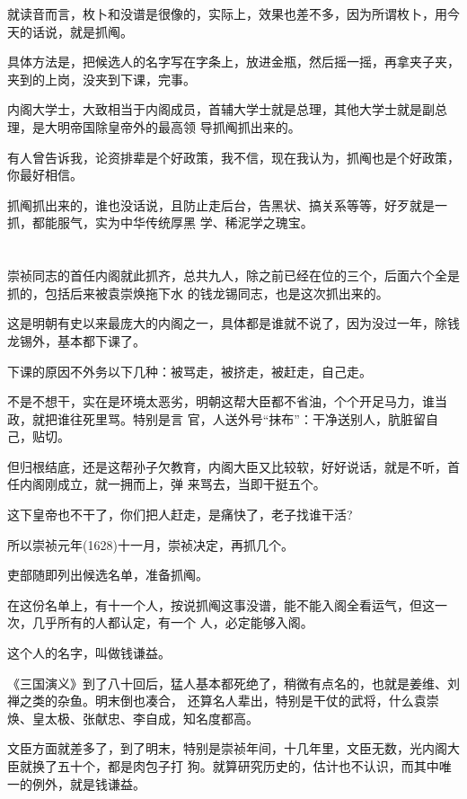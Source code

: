 \documentclass[11pt,a4paper,onecolumn]{article}
\begin{document}
就读音而言，枚卜和没谱是很像的，实际上，效果也差不多，因为所谓枚卜，用今天的话说，就是抓阄。

具体方法是，把候选人的名字写在字条上，放进金瓶，然后摇一摇，再拿夹子夹，夹到的上岗，没夹到下课，完事。

内阁大学士，大致相当于内阁成员，首辅大学士就是总理，其他大学士就是副总理，是大明帝国除皇帝外的最高领
导\myrule 抓阄抓出来的。

有人曾告诉我，论资排辈是个好政策，我不信，现在我认为，抓阄也是个好政策，你最好相信。

抓阄抓出来的，谁也没话说，且防止走后台，告黑状、搞关系等等，好歹就是一抓，都能服气，实为中华传统厚黑
学、稀泥学之瑰宝。

\section[\thesection]{}

崇祯同志的首任内阁就此抓齐，总共九人，除之前已经在位的三个，后面六个全是抓的，包括后来被袁崇焕拖下水
的钱龙锡同志，也是这次抓出来的。

这是明朝有史以来最庞大的内阁之一，具体都是谁就不说了，因为没过一年，除钱龙锡外，基本都下课了。

下课的原因不外务以下几种：被骂走，被挤走，被赶走，自己走。

不是不想干，实在是环境太恶劣，明朝这帮大臣都不省油，个个开足马力，谁当政，就把谁往死里骂。特别是言
官，人送外号``抹布''：干净送别人，肮脏留自己，贴切。

但归根结底，还是这帮孙子欠教育，内阁大臣又比较软，好好说话，就是不听，首任内阁刚成立，就一拥而上，弹
来骂去，当即干挺五个。

这下皇帝也不干了，你们把人赶走，是痛快了，老子找谁干活?

所以崇祯元年(1628)十一月，崇祯决定，再抓几个。

吏部随即列出候选名单，准备抓阄。

在这份名单上，有十一个人，按说抓阄这事没谱，能不能入阁全看运气，但这一次，几乎所有的人都认定，有一个
人，必定能够入阁。

这个人的名字，叫做钱谦益。

《三国演义》到了八十回后，猛人基本都死绝了，稍微有点名的，也就是姜维、刘禅之类的杂鱼。明末倒也凑合，
还算名人辈出，特别是干仗的武将，什么袁崇焕、皇太极、张献忠、李自成，知名度都高。

文臣方面就差多了，到了明末，特别是崇祯年间，十几年里，文臣无数，光内阁大臣就换了五十个，都是肉包子打
狗。就算研究历史的，估计也不认识，而其中唯一的例外，就是钱谦益。
\end{document}
